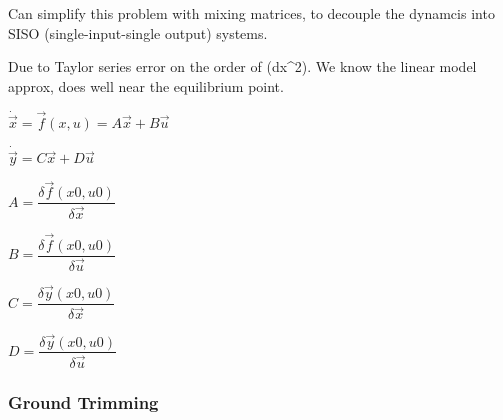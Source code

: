 \documentclass[11pt]{article}
\begin{document}
Can simplify this problem with mixing matrices, to decouple the dynamcis
into SISO (single-input-single output) systems.

    Due to Taylor series error on the order of (dx\^{}2). We know the linear
model approx, does well near the equilibrium point.

    \(\dot{\vec{x}} = \vec{f}(x, u) = A \vec{x} + B \vec{u}\)

\(\dot{\vec{y}} = C \vec{x} + D \vec{u}\)

\(A = \dfrac{\delta \vec{f}(x0, u0)}{\delta \vec{x}}\)

\(B = \dfrac{\delta \vec{f}(x0, u0)}{\delta \vec{u}}\)

\(C = \dfrac{\delta \vec{y}(x0, u0)}{\delta \vec{x}}\)

\(D = \dfrac{\delta \vec{y}(x0, u0)}{\delta \vec{u}}\)

    \hypertarget{ground-trimming}{%
\subsubsection{Ground Trimming}\label{ground-trimming}}
\end{document}
